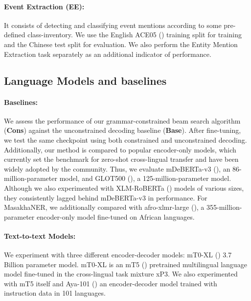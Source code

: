 \paragraph{Event Extraction (EE):} It consists of detecting and classifying event mentions according to some pre-defined class-inventory. We use the English ACE05 (\cite{ACE}) training split for training and the Chinese test split for evaluation. We also perform the Entity Mention Extraction task separately as an additional indicator of performance. 

\subsection{Language Models and baselines}

\paragraph{Baselines:} We assess the performance of our grammar-constrained beam search algorithm (\textbf{Cons}) against the unconstrained decoding baseline (\textbf{Base}). After fine-tuning, we test the same checkpoint using both constrained and unconstrained decoding. Additionally, our method is compared to popular encoder-only models, which currently set the benchmark for zero-shot cross-lingual transfer and have been widely adopted by the community. Thus, we evaluate mDeBERTa-v3 (\cite{DBLP:conf/iclr/HeLGC21/deberta}), an 86-million-parameter model, and GLOT500 (\cite{DBLP:conf/acl/ImaniLKSSKMSMYS23}), a 125-million-parameter model. Although we also experimented with XLM-RoBERTa (\cite{conneau-etal-2020-unsupervised}) models of various sizes, they consistently lagged behind mDeBERTa-v3 in performance. For MasakhaNER, we additionally compared with afro-xlmr-large (\cite{alabi-etal-2022-adapting}), a 355-million-parameter encoder-only model fine-tuned on African languages.

\paragraph{Text-to-text Models:} We experiment with three different encoder-decoder models: mT0-XL (\cite{DBLP:conf/acl/MuennighoffWSRB23}) 3.7 Billion parameter model. mT0-XL is an mT5 (\cite{mt5}) pretrained multilingual language model fine-tuned in the cross-lingual task mixture xP3. We also experimented with mT5 itself and Aya-101 (\cite{aya101}) an encoder-decoder model trained with instruction data in 101 languages. 

